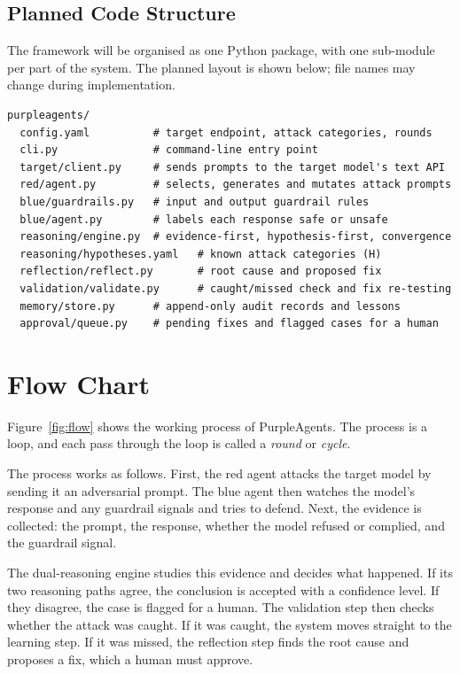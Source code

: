 \subsection{Planned Code Structure}

The framework will be organised as one Python package, with one sub-module per
part of the system. The planned layout is shown below; file names may change
during implementation.

\begin{lstlisting}
purpleagents/
  config.yaml          # target endpoint, attack categories, rounds
  cli.py               # command-line entry point
  target/client.py     # sends prompts to the target model's text API
  red/agent.py         # selects, generates and mutates attack prompts
  blue/guardrails.py   # input and output guardrail rules
  blue/agent.py        # labels each response safe or unsafe
  reasoning/engine.py  # evidence-first, hypothesis-first, convergence
  reasoning/hypotheses.yaml   # known attack categories (H)
  reflection/reflect.py       # root cause and proposed fix
  validation/validate.py      # caught/missed check and fix re-testing
  memory/store.py      # append-only audit records and lessons
  approval/queue.py    # pending fixes and flagged cases for a human
\end{lstlisting}

\section{Flow Chart}

Figure~\ref{fig:flow} shows the working process of PurpleAgents. The process is
a loop, and each pass through the loop is called a \emph{round} or \emph{cycle}.


The process works as follows. First, the red agent attacks the target model by
sending it an adversarial prompt. The blue agent then watches the model's
response and any guardrail signals and tries to defend. Next, the evidence is
collected: the prompt, the response, whether the model refused or complied, and
the guardrail signal.

The dual-reasoning engine studies this evidence and decides what happened. If its
two reasoning paths agree, the conclusion is accepted with a confidence level. If
they disagree, the case is flagged for a human. The validation step then checks
whether the attack was caught. If it was caught, the system moves straight to the
learning step. If it was missed, the reflection step finds the root cause and
proposes a fix, which a human must approve.

